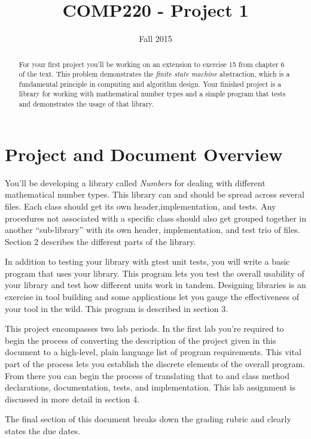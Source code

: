 \documentclass[10pt]{article}
\title{COMP220 - Project 1}
\author{ }
\date{Fall 2015}
\begin{document}
\maketitle
\thispagestyle{empty}

\begin{abstract}
For your first project you'll be working on an extension to exercise 15 from chapter 6 of the text. This problem demonstrates the \textit{finite state machine} abstraction, which is a fundamental principle in computing and algorithm design. Your finished project is a library for working with mathematical number types and a simple program that tests and demonstrates the usage of that library. 
\end{abstract}

\section{Project and Document Overview}

You'll be developing a library called \textit{Numbers} for dealing with different mathematical number types. This library can and should be spread across several files. Each class should get its own header,implementation, and tests. Any procedures not associated with a specific class should also get grouped together in another ``sub-library'' with its own header, implementation, and test trio of files. Section 2 describes the different parts of the library. 

In addition to testing your library with gtest unit tests, you will write a basic program that uses your library. This program lets you test the overall usability of your library and test how different units work in tandem. Designing libraries is an exercise in tool building and some applications let you gauge the effectiveness of your tool in the wild. This program is described in section 3.

This project encompasses two lab periods. In the first lab you're required to begin the process of converting the description of the project given in this document to a high-level, plain language list of program requirements. This vital part of the process lets you establish the discrete elements of the overall program. From there you can begin the process of translating that to  and class method declarations, documentation, tests, and implementation. This lab assignment is discussed in more detail in section 4.

The final section of this document breaks down the grading rubric and clearly states the due dates.
\end{document}
